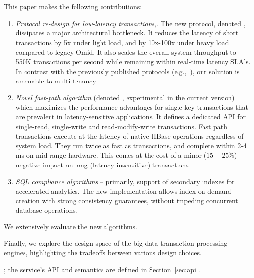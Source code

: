 This paper makes the following contributions: 
\begin{enumerate}
    \setlength{\itemsep}{1pt}
    \setlength{\parskip}{1pt}
    \setlength{\parsep}{1pt}  

\item {\em Protocol re-design for low-latency transactions},. 
The new protocol, denoted \sysll, dissipates a major architectural bottleneck. 
It reduces the latency of short transactions by 5x under light load, and 
by 10x-100x under heavy load compared to legacy Omid. It also scales 
the overall system throughput to 550K transactions per second while remaining 
within real-time latency SLA's. In contrast with the previously published protocols 
(e.g.,~\cite{Percolator2010}), our solution is amenable to multi-tenancy.

\item {\em Novel fast-path algorithm\/} (denoted \sys, experimental in the current version) 
which maximizes the performance advantages for single-key transactions that are prevalent 
in latency-sensitive applications. It defines a dedicated API for single-read, 
single-write and read-modify-write transactions.  Fast path transactions execute at the 
latency of native HBase operations regardless of system load.
They run twice as fast as \sysll\/ transactions, and complete within 2-4 ms on mid-range hardware. 
This comes at the cost of a minor ($15-25\%$) negative impact on long (latency-insensitive) transactions.  

\item {\em SQL compliance algorithms\/} -- primarily, support of secondary indexes for 
accelerated analytics. The new implementation allows index on-demand creation with 
strong consistency guarantees, without impeding concurrent database operations. 
   
\end{enumerate}

We extensively evaluate the new algorithms. 

Finally, we explore the design space of the big data 
transaction processing engines, highlighting the tradeoffs between various design choices.

; the service's API and semantics are defined in  Section~\ref{sec:api}.  



